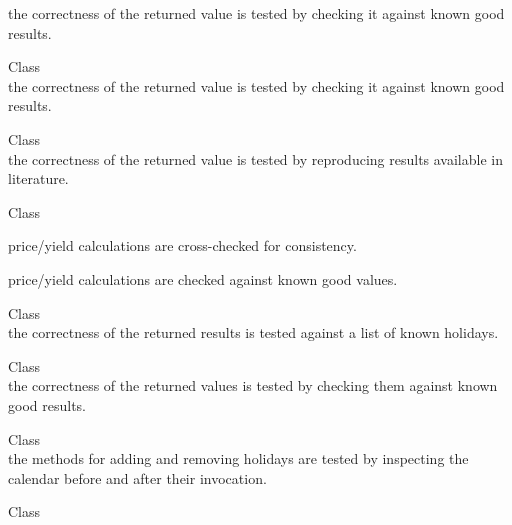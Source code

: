 \begin{DoxyRefList}
\label{test__test000032}%
%
the correctness of the returned value is tested by checking it against known good results.  
\item[Class \doxylink{class_quant_lib_1_1_bivariate_cumulative_normal_distribution_we04_d_p}{Quant\+Lib\+::Bivariate\+Cumulative\+Normal\+Distribution\+We04\+DP} ]\hfill \\
\label{test__test000033}%
%
the correctness of the returned value is tested by checking it against known good results.  
\item[Class \doxylink{class_quant_lib_1_1_bjerksund_stensland_approximation_engine}{Quant\+Lib\+::Bjerksund\+Stensland\+Approximation\+Engine} ]\hfill \\
\label{test__test000148}%
%
the correctness of the returned value is tested by reproducing results available in literature.  
\item[Class \doxylink{class_quant_lib_1_1_bond}{Quant\+Lib\+::Bond} ]\hfill \\
\label{test__test000018}%
%

\begin{DoxyItemize}
\item price/yield calculations are cross-\/checked for consistency.
\item price/yield calculations are checked against known good values. 
\end{DoxyItemize}
\item[Class \doxylink{class_quant_lib_1_1_brazil}{Quant\+Lib\+::Brazil} ]\hfill \\
\label{test__test000171}%
%
the correctness of the returned results is tested against a list of known holidays.  
\item[Class \doxylink{class_quant_lib_1_1_brent}{Quant\+Lib\+::Brent} ]\hfill \\
\label{test__test000068}%
%
the correctness of the returned values is tested by checking them against known good results. 
\item[Class \doxylink{class_quant_lib_1_1_calendar}{Quant\+Lib\+::Calendar} ]\hfill \\
\label{test__test000170}%
%
the methods for adding and removing holidays are tested by inspecting the calendar before and after their invocation.  
\item[Class \doxylink{class_quant_lib_1_1_cap_floor}{Quant\+Lib\+::Cap\+Floor} ]\hfill \\
\label{test__test000023}%
%


\end{DoxyRefList}
